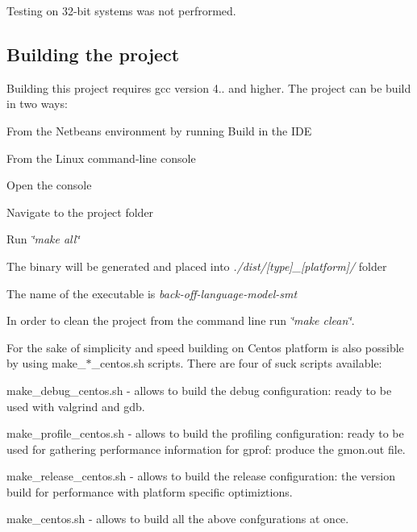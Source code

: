 Testing on 32-\/bit systems was not perfrormed.

\subsection*{Building the project}

Building this project requires gcc version 4.. and higher. The project can be build in two ways\+:


\begin{DoxyItemize}
\item From the Netbeans environment by running Build in the I\+D\+E
\item From the Linux command-\/line console
\begin{DoxyItemize}
\item Open the console
\item Navigate to the project folder
\item Run {\itshape \char`\"{}make all\char`\"{}}
\item The binary will be generated and placed into {\itshape ./dist/\mbox{[}type\mbox{]}\+\_\+\mbox{[}platform\mbox{]}/} folder
\item The name of the executable is {\itshape back-\/off-\/language-\/model-\/smt}
\end{DoxyItemize}
\end{DoxyItemize}

In order to clean the project from the command line run {\itshape \char`\"{}make clean\char`\"{}}.

For the sake of simplicity and speed building on Centos platform is also possible by using make\+\_\+$\ast$\+\_\+centos.sh scripts. There are four of suck scripts available\+:


\begin{DoxyItemize}
\item make\+\_\+debug\+\_\+centos.\+sh -\/ allows to build the debug configuration\+: ready to be used with valgrind and gdb.
\item make\+\_\+profile\+\_\+centos.\+sh -\/ allows to build the profiling configuration\+: ready to be used for gathering performance information for gprof\+: produce the gmon.\+out file.
\item make\+\_\+release\+\_\+centos.\+sh -\/ allows to build the release configuration\+: the version build for performance with platform specific optimiztions.
\item make\+\_\+centos.\+sh -\/ allows to build all the above confgurations at once.
\end{DoxyItemize}

